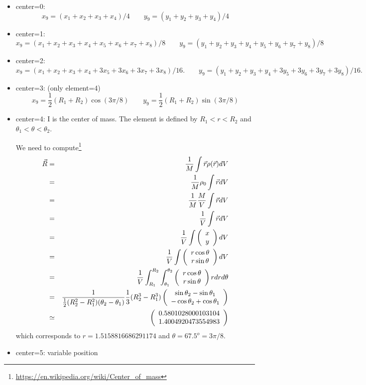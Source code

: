 \begin{itemize}
\item {\python center=0}: 
\[
x_9=(x_1+x_2+x_3+x_4)/4 
\qquad
y_9=(y_1+y_2+y_3+y_4)/4
\]

\item {\python center=1}: 
\[
x_9=(x_1+x_2+x_3+x_4+x_5+x_6+x_7+x_8)/8 
\qquad
y_9=(y_1+y_2+y_3+y_4+y_5+y_6+y_7+y_8)/8
\]
\item {\python center=2}:
\[
x_9=(x_1+x_2+x_3+x_4+3x_5+3x_6+3x_7+3x_8)/16. 
\qquad
y_9=(y_1+y_2+y_3+y_4+3y_5+3y_6+3y_7+3y_8)/16.
\]
\item {\python center=3}: (only element=4)
\[
x_9=\frac12(R_1+R_2)\cos(3\pi/8) 
\qquad
y_9=\frac12(R_1+R_2)\sin(3\pi/8)
\]
\item {\python center=4}: I is the center of mass. 
The element is defined by $R_1<r<R_2$ and $\theta_1<\theta<\theta_2$.

We need to compute\footnote{\url{https://en.wikipedia.org/wiki/Center_of_mass}}
\begin{eqnarray}
\vec{R} 
&=&\frac{1}{M} \int \vec{r} \rho(\vec r) dV \nonumber\\
&=&\frac{1}{M} \rho_0 \int \vec{r} dV\nonumber\\
&=&\frac{1}{M} \frac{M}{V} \int \vec{r} dV\nonumber\\
&=&\frac{1}{V} \int \vec{r} dV\nonumber\\
&=&\frac{1}{V} \int \left(\begin{array}{c} x \\ y \end{array}\right)  dV\nonumber\\
&=&\frac{1}{V} \int \left(\begin{array}{c} r \cos \theta \\ r \sin\theta \end{array}\right)dV\nonumber\\
&=&\frac{1}{V} \int_{R_1}^{R_2} \int_{\theta_1}^{\theta_2} \left(\begin{array}{c} r \cos \theta 
\\ r \sin\theta \end{array}\right)  r dr d\theta\nonumber\\
&=&\frac{1}{\frac12 (R_2^2-R_1^2) (\theta_2-\theta_1)} \frac13(R_2^3-R_1^3) 
\left(
\begin{array}{c}
\sin\theta_2-\sin\theta_1 \\
-\cos\theta_2+\cos\theta_1 
\end{array}
\right) \nonumber\\
&\simeq& 
\left(
\begin{array}{c}
0.5801028000103104\\
1.4004920473554983
\end{array}
\right) 
\end{eqnarray}
which corresponds to $r=1.5158816686291174$ and $\theta=67.5^o=3\pi/8$.

\item {\python center=5}: variable position
\end{itemize}


